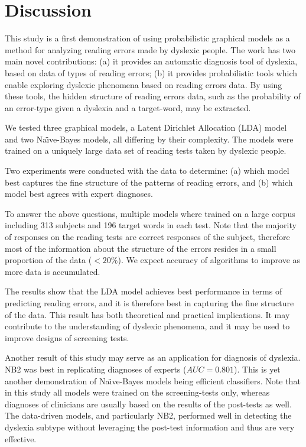 {{\section{Discussion}
This study is a first demonstration of using probabilistic graphical models as a method for analyzing reading errors made by dyslexic people. The work has two main novel contributions: (a) it provides an automatic diagnosis tool of dyslexia, based on data of types of reading errors; (b) it provides probabilistic tools which enable exploring dyslexic phenomena based on reading errors data. By using these tools, the hidden structure of reading errors data, such as the probability of an error-type given a dyslexia and a target-word, may be extracted.

We tested three graphical models, a Latent Dirichlet Allocation (LDA) model and two Na\"{\i}ve-Bayes models, all differing by their complexity. The models were trained on a uniquely large data set of reading tests taken by dyslexic people.

Two experiments were conducted with the data to determine: (a) which model best captures the fine structure of the patterns of reading errors, and (b) which model best agrees with expert diagnoses. 

To answer the above questions, multiple models where train\-ed on a large corpus including 313 subjects and 196 target words in each test. Note that the majority of responses on the reading tests are correct responses of the subject, therefore most of the information about the structure of the errors resides in a small proportion of the data ($<20\%$). We expect accuracy of algorithms to improve as more data is accumulated.

The results show that the LDA model achieves best performance in terms of predicting reading errors, and it is therefore best in capturing the fine structure of the data. This result has both theoretical and practical implications. It may contribute to the understanding of dyslexic phenomena, and it may be used to improve designs of screening tests.

Another result of this study may serve as an application for diagnosis of dyslexia. NB2 was best in replicating diagnoses of experts ($AUC = 0.801$). This is yet another demonstration of Na\"{\i}ve-Bayes models being efficient classifiers. Note that in this study all models were trained on the screening-tests only, whereas diagnoses of clinicians are usually based on the results of the post-tests as well. The data-driven models, and particularly NB2, performed well in detecting the dyslexia subtype without leveraging the post-test information and thus are very effective.

}}

